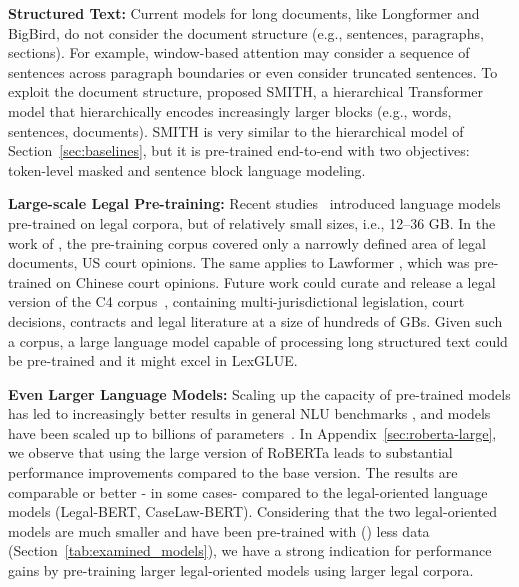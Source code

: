 \documentclass[11pt]{article}
\begin{document}
\noindent\textbf{Structured Text:} 
Current models for long documents, like Longformer and BigBird, do not consider the document structure (e.g., sentences, paragraphs, sections). For example, window-based attention may consider a sequence of sentences across paragraph boundaries or even consider truncated sentences.
To exploit the document structure, \citet{yang-etal-2020-smith} proposed SMITH, a hierarchical Transformer model that hierarchically encodes increasingly larger blocks (e.g., words, sentences, documents). SMITH is very similar to the hierarchical model of Section~\ref{sec:baselines}, but it is pre-trained end-to-end with two objectives: token-level masked and sentence block language modeling. \vspace{2mm}

\noindent\textbf{Large-scale Legal Pre-training:} 
Recent studies~\cite{chalkidis-etal-2020-legalbert,zhengguha2021,bambroo-etal-2021,xiao-etal-2021} introduced  language models pre-trained on legal corpora, but of relatively small sizes, i.e., 12--36 GB. In the work of \citet{zhengguha2021}, the pre-training corpus covered only a narrowly defined area of legal documents, US court opinions. The same applies to Lawformer \cite{xiao-etal-2021}, which was pre-trained on Chinese court opinions. 
Future work could curate and release a legal version of the C4 corpus~\cite{JMLR:v21:20-074}, containing multi-jurisdictional legislation, court decisions, contracts and legal literature at a size of hundreds of GBs. Given such a corpus, a large language model capable of processing long structured text could be pre-trained and it might excel in LexGLUE.\vspace{2mm}

\noindent\textbf{Even Larger Language Models:} Scaling up the capacity of pre-trained models has led to increasingly better results in general NLU benchmarks \cite{kaplan2020}, and models have been scaled up to billions of parameters~\cite{brown2020language,JMLR:v21:20-074, he2021deberta}. In Appendix~\ref{sec:roberta-large}, we observe that using the large version of RoBERTa leads to substantial performance improvements compared to the base version. The results are comparable or better - in some cases- compared to the legal-oriented language models (Legal-BERT, CaseLaw-BERT). Considering that the two legal-oriented models are much smaller and have been pre-trained with () less data (Section~\ref{tab:examined_models}), we have a strong indication for performance gains by pre-training larger legal-oriented models using larger legal corpora.
\end{document}
